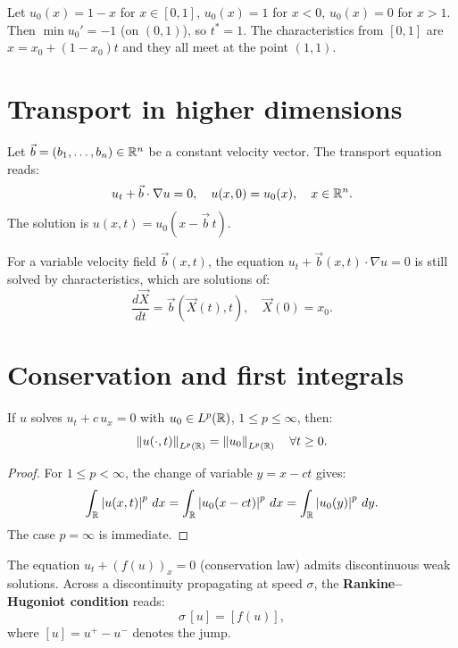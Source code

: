 \begin{example}
Let $u_0(x) = 1 - x$ for $x \in [0,1]$, $u_0(x) = 1$ for $x < 0$,
$u_0(x) = 0$ for $x > 1$. Then $\min u_0' = -1$ (on $(0,1)$), so
$t^* = 1$. The characteristics from $[0,1]$ are $x = x_0 + (1-x_0)t$
and they all meet at the point $(1,1)$.
\end{example}

\section{Transport in higher dimensions}

\begin{definition}
Let $\vec{b} = (b_1, \ldots, b_n) \in \mathbb{R}^n$ be a constant velocity vector.
The transport equation reads:
\begin{equation}\label{eq:transport_Rn}
    u_t + \vec{b} \cdot \nabla u = 0, \quad u(x,0) = u_0(x),
    \quad x \in \mathbb{R}^n.
\end{equation}
The solution is $u(x,t) = u_0(x - \vec{b}\, t)$.
\end{definition}

For a variable velocity field $\vec{b}(x,t)$, the equation
$u_t + \vec{b}(x,t) \cdot \nabla u = 0$ is still solved by
characteristics, which are solutions of:
\[
    \frac{d\vec{X}}{dt} = \vec{b}(\vec{X}(t), t), \quad \vec{X}(0) = x_0.
\]

\section{Conservation and first integrals}

\begin{proposition}
If $u$ solves $u_t + c\, u_x = 0$ with $u_0 \in L^p(\mathbb{R})$,
$1 \leq p \leq \infty$, then:
\[
    \left\| u(\cdot, t) \right\|_{L^p(\mathbb{R})} = \left\| u_0 \right\|_{L^p(\mathbb{R})}
    \quad \forall t \geq 0.
\]
\end{proposition}

\begin{proof}
For $1 \leq p < \infty$, the change of variable $y = x - ct$ gives:
\[
    \int_{\mathbb{R}} \left| u(x,t) \right|^p\, dx
    = \int_{\mathbb{R}} \left| u_0(x-ct) \right|^p\, dx
    = \int_{\mathbb{R}} \left| u_0(y) \right|^p\, dy.
\]
The case $p = \infty$ is immediate.
\end{proof}

\begin{theorem}
The equation $u_t + (f(u))_x = 0$ (conservation law) admits discontinuous
weak solutions. Across a discontinuity propagating at speed $\sigma$,
the \textbf{Rankine--Hugoniot condition} reads:
\begin{equation}\label{eq:rankine_hugoniot}
    \sigma\, [u] = [f(u)],
\end{equation}
where $[u] = u^+ - u^-$ denotes the jump.
\end{theorem}

